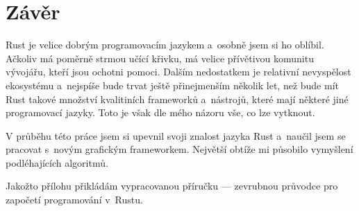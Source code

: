 \documentclass[a4paper, 12pt, twoside]{article} %
\begin{document}
\section{Závěr}
	Rust je velice dobrým programovacím jazykem a~osobně jsem si ho oblíbil. Ačkoliv má poměrně strmou učící křivku, má velice přívětivou komunitu vývojářu, kteří jsou ochotni pomoci. Dalším nedostatkem je relativní nevyspělost ekosystému a~nejspíše bude trvat ještě přinejmenším několik let, než bude mít Rust takové množství kvalitiních frameworků a~nástrojů, které mají některé jiné programovací jazyky. Toto je však dle mého názoru vše, co lze vytknout.
	
	V průběhu této práce jsem si upevnil svoji znalost jazyka Rust a~naučil jsem se pracovat s~novým grafickým frameworkem. Největší obtíže mi působilo vymyšlení podléhajících algoritmů.
	
	Jakožto přílohu přikládám vypracovanou příručku — zevrubnou průvodce pro započetí programování v~Rustu.



\end{document}
